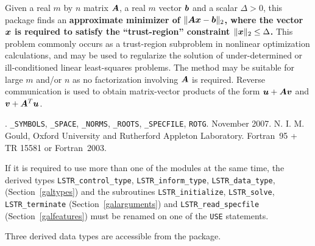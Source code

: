 \documentclass{galahad}
\newcommand{\packagename}{LS\-TR}
\newcommand{\fullpackagename}{\libraryname\_\packagename}
\begin{document}
\galheader


\galsummary
Given a real $m$ by $n$ matrix ${\bm{A}}$, a real
$m$ vector ${\bm{b}}$ and a scalar $\Delta>0$, this package finds an
{\bf approximate minimizer of $\| {\bm{A}} {\bm{x}} - {\bm{b}}\|_2$, where the vector
${\bm{x}}$ is required to satisfy the ``trust-region''
constraint $\|{\bm{x}}\|_2 \leq  \Delta$.}
This problem commonly occurs as a trust-region subproblem in nonlinear
optimization calculations, and may be used to regularize the solution
of under-determined or ill-conditioned linear least-squares problems.
The method may be suitable for large $m$ and/or $n$ as no factorization
involving ${\bm{A}}$ is required. Reverse communication is used to obtain
matrix-vector products of the form ${\bm{u}} + {\bm{A}} {\bm{v}}$ and
${\bm{v}} + {\bm{A}}^T {\bm{u}}$.


\galattributes
\galversions{\tt  \fullpackagename\_single, \fullpackagename\_double}.
\galuses
{\tt \libraryname\_SY\-M\-BOLS},
{\tt \libraryname\_SPACE}, {\tt \libraryname\_\-NORMS},
{\tt \libraryname\_ROOTS}, {\tt \libraryname\_SPECFILE},
{\tt *ROTG}.
\galdate November 2007.
\galorigin N. I. M. Gould, Oxford University and Rutherford Appleton Laboratory.
\gallanguage Fortran~95 + TR 15581 or Fortran~2003.


\galhowto



\noindent
If it is required to use more than one of the modules at the same time, 
the derived types
{\tt \packagename\_control\_type}, {\tt \packagename\_inform\_type},
{\tt \packagename\_data\_type},
(Section~\ref{galtypes})
and the subroutines
{\tt \packagename\_initialize},
{\tt \packagename\_solve}, {\tt \packagename\_terminate}
(Section~\ref{galarguments})
and
{\tt \packagename\_read\_specfile}
(Section~\ref{galfeatures})
must be renamed on one of the {\tt USE} statements.





\galtypes
Three derived data types are accessible from the package.

\end{document}
